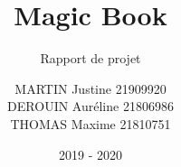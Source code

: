 \documentclass[report]{BetterDocument}
\title{Magic Book}
\subtitle{Rapport de projet}
\author{MARTIN Justine 21909920\\
	DEROUIN Auréline 21806986\\
	THOMAS Maxime 21810751
}
\date{2019 - 2020}
\institute{Unicaen}
\begin{document}
	\pageDeGarde

	\tableDesMatieres

	
\end{document}
